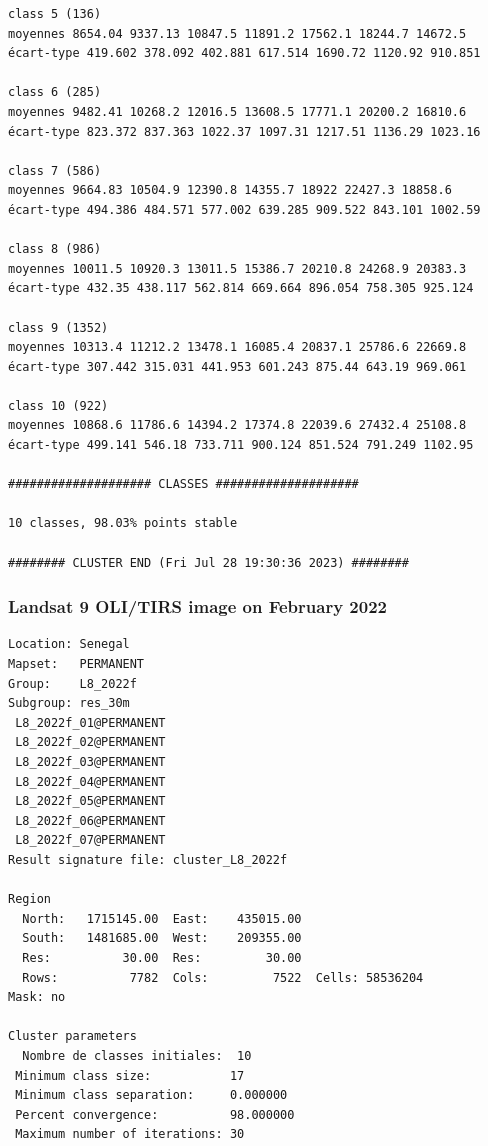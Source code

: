 \documentclass[earth,article,submit,pdftex,moreauthors]{Definitions/mdpi}
\begin{document}
{\begin{scriptsize}
\begin{verbatim}
class 5 (136)
moyennes 8654.04 9337.13 10847.5 11891.2 17562.1 18244.7 14672.5
écart-type 419.602 378.092 402.881 617.514 1690.72 1120.92 910.851

class 6 (285)
moyennes 9482.41 10268.2 12016.5 13608.5 17771.1 20200.2 16810.6
écart-type 823.372 837.363 1022.37 1097.31 1217.51 1136.29 1023.16

class 7 (586)
moyennes 9664.83 10504.9 12390.8 14355.7 18922 22427.3 18858.6
écart-type 494.386 484.571 577.002 639.285 909.522 843.101 1002.59

class 8 (986)
moyennes 10011.5 10920.3 13011.5 15386.7 20210.8 24268.9 20383.3
écart-type 432.35 438.117 562.814 669.664 896.054 758.305 925.124

class 9 (1352)
moyennes 10313.4 11212.2 13478.1 16085.4 20837.1 25786.6 22669.8
écart-type 307.442 315.031 441.953 601.243 875.44 643.19 969.061

class 10 (922)
moyennes 10868.6 11786.6 14394.2 17374.8 22039.6 27432.4 25108.8
écart-type 499.141 546.18 733.711 900.124 851.524 791.249 1102.95

#################### CLASSES ####################

10 classes, 98.03% points stable

######## CLUSTER END (Fri Jul 28 19:30:36 2023) ########

\end{verbatim}
\end{scriptsize}

\subsubsection[\appendixname~\thesubsubsection]{Landsat 9 OLI/TIRS image on February 2022}
\begin{scriptsize}
\begin{verbatim}
Location: Senegal
Mapset:   PERMANENT
Group:    L8_2022f
Subgroup: res_30m
 L8_2022f_01@PERMANENT
 L8_2022f_02@PERMANENT
 L8_2022f_03@PERMANENT
 L8_2022f_04@PERMANENT
 L8_2022f_05@PERMANENT
 L8_2022f_06@PERMANENT
 L8_2022f_07@PERMANENT
Result signature file: cluster_L8_2022f

Region
  North:   1715145.00  East:    435015.00
  South:   1481685.00  West:    209355.00
  Res:          30.00  Res:         30.00
  Rows:          7782  Cols:         7522  Cells: 58536204
Mask: no

Cluster parameters
  Nombre de classes initiales: 	10
 Minimum class size:           17
 Minimum class separation:     0.000000
 Percent convergence:          98.000000
 Maximum number of iterations: 30


\end{verbatim}
\end{scriptsize}}
\end{document}
